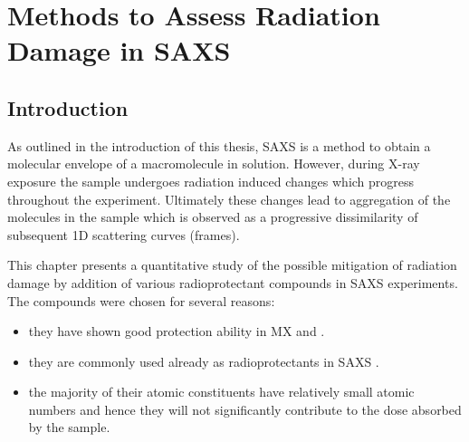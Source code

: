 \chapter{Methods to Assess Radiation Damage in SAXS}
\label{chap:Methods to assess radiation damage in SAXS}

\section{Introduction}
\label{sec:Introduction - SAXS}
 As outlined in the introduction of this thesis, SAXS is a method to obtain a molecular envelope of a macromolecule in solution.
 However, during X-ray exposure the sample undergoes radiation induced changes which progress throughout the experiment.
 Ultimately these changes lead to aggregation of the molecules in the sample which is observed as a progressive dissimilarity of subsequent 1D scattering curves (frames).

 This chapter presents a quantitative study of the possible mitigation of radiation damage by addition of various radioprotectant compounds in SAXS experiments. The compounds were chosen for several reasons:
 \begin{itemize}
     \item they have shown good protection ability in MX \cite{allan2012} and \cite{southworth2007radioprotectant}.
     \item they are commonly used already as radioprotectants in SAXS \cite{grishaev2012sample}.
     \item the majority of their atomic constituents have relatively small atomic numbers and hence they will not significantly contribute to the dose absorbed by the sample.
 \end{itemize}
